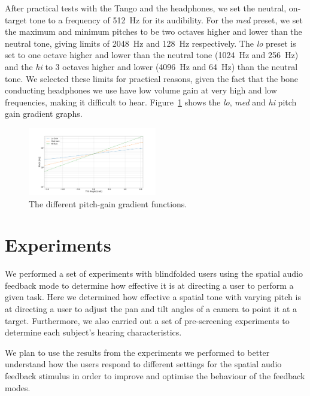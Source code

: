 \documentclass[format=sigconf, review=true, screen=true, anonymous=true]{acmart}
\begin{document}
After practical tests with the Tango and the headphones, we set the neutral, on-target tone to a frequency of \SI{512}{\hertz} for its audibility. For the \emph{med} preset, we set the maximum and minimum pitches to be two octaves higher and lower than the neutral tone, giving limits of \SI{2048}{\hertz} and \SI{128}{\hertz} respectively. The \emph{lo} preset is set to one octave higher and lower than the neutral tone (\SI{1024}{\hertz} and \SI{256}{\hertz}) and the \emph{hi} to 3 octaves higher and lower (\SI{4096}{\hertz} and \SI{64}{\hertz}) than the neutral tone. We selected these limits for practical reasons, given the fact that the bone conducting headphones we use have low volume gain at very high and low frequencies, making it difficult to hear. Figure~\ref{fig:pitch-preset-plot} shows the \emph{lo}, \emph{med} and \emph{hi} pitch gain gradient graphs.  

\begin{figure}
  \centering
  \includegraphics[width=0.5\textwidth]{figures/pitch_gradient.pdf}
  \caption{The different pitch-gain gradient functions.}
  \label{fig:pitch-preset-plot}
\end{figure}

\section{Experiments}
\label{sec:experiments}

We performed a set of experiments with blindfolded users using the spatial audio feedback mode to determine how effective it is at directing a user to perform a given task. Here we determined how effective a spatial tone with varying pitch is at directing a user to adjust the pan and tilt angles of a camera to point it at a target. Furthermore, we also carried out a set of pre-screening experiments to determine each subject's hearing characteristics. %

We plan to use the results from the experiments we performed to better understand how the users respond to different settings for the spatial audio feedback stimulus in order to improve and optimise the behaviour of the feedback modes.
\end{document}
